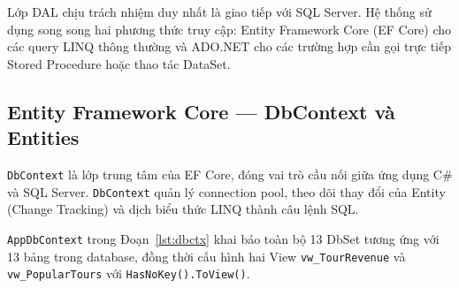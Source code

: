 Lớp DAL chịu trách nhiệm duy nhất là giao tiếp với SQL Server.
Hệ thống sử dụng song song hai phương thức truy cập: Entity
Framework Core (EF Core) cho các query LINQ thông thường và
ADO.NET cho các trường hợp cần gọi trực tiếp Stored Procedure
hoặc thao tác DataSet.

\subsection{Entity Framework Core — DbContext và Entities}
  \label{sub3.4.1}

\begin{de}\label{def3.7}
\texttt{DbContext} là lớp trung tâm của EF Core, đóng vai trò
cầu nối giữa ứng dụng C\# và SQL Server. \texttt{DbContext}
quản lý connection pool, theo dõi thay đổi của Entity
(Change Tracking) và dịch biểu thức LINQ thành câu lệnh SQL.
\end{de}

\texttt{AppDbContext} trong Đoạn~\ref{lst:dbctx} khai báo
toàn bộ 13 DbSet tương ứng với 13 bảng trong database, đồng
thời cấu hình hai View \texttt{vw\_TourRevenue} và
\texttt{vw\_PopularTours} với \texttt{HasNoKey().ToView()}.

